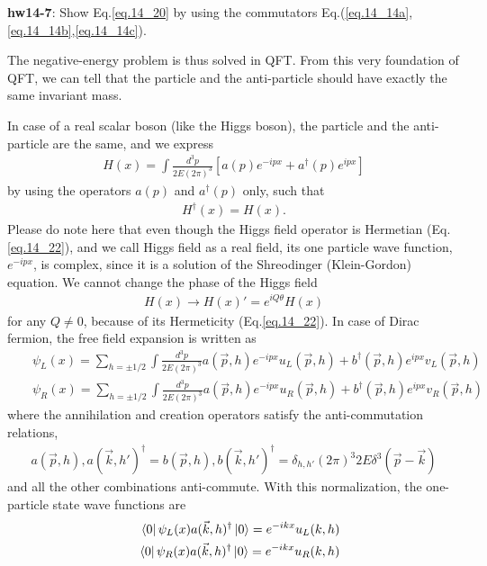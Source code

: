 \documentclass[12pt]{article}
\begin{document}
{\bf hw14-7}: Show Eq.\ref{eq.14_20} by using the commutators Eq.(\ref{eq.14_14a},\ref{eq.14_14b},\ref{eq.14_14c}).

  The negative-energy problem is thus solved in QFT.  From this very
  foundation of QFT, we can tell that the particle and the anti-particle
  should have exactly the same invariant mass.

  In case of a real scalar boson (like the Higgs boson), the particle
  and the anti-particle are the same, and we express
\begin{eqnarray}
  H(x) = \int \frac{d^3p}{2E(2\pi)^3} [a(p) e^{-ipx} + a^\dagger(p) e^{ipx}]\label{eq.14_21}
\end{eqnarray}
  by using the operators $a(p)$ and $a^\dagger(p)$ only, such that
\begin{eqnarray}
  H^\dagger(x) = H(x). \label{eq.14_22}
\end{eqnarray}
  Please do note here that even though the Higgs field operator is
  Hermetian (Eq.\ref{eq.14_22}), and we call Higgs field as a real field, its one particle wave function, $e^{-ipx}$, is complex, since it is a solution
  of the Shreodinger (Klein-Gordon) equation. We cannot change the
  phase of the Higgs field
\begin{eqnarray}
  H(x) \to H(x)' = e^{iQ\theta} H(x) \label{eq.14_23}
\end{eqnarray}
  for any $Q \neq 0$, because of its Hermeticity (Eq.\ref{eq.14_22}).
  In case of Dirac fermion, the free field expansion is written as
\begin{eqnarray}
  &&\psi_L(x)
  = \sum_{h=\pm1/2} \int \frac{d^3p}{2E(2\pi)^3}
  {a({\vec p},h) e^{-ipx} u_L({\vec p},h) +b^\dagger({\vec p},h) e^{ipx} v_L({\vec p},h)} \label{eq.14_24a}\\ 
  &&\psi_R(x)
  = \sum_{h=\pm1/2} \int \frac{d^3p}{2E(2\pi)^3}
  {a({\vec p},h) e^{-ipx} u_R({\vec p},h) +b^\dagger({\vec p},h) e^{ipx} v_R({\vec p},h)}\label{eq.14_24b}
\end{eqnarray}
  where the annihilation and creation operators satisfy the
  anti-commutation relations,
\begin{eqnarray}
  { a({\vec p},h), a({\vec k},h')^\dagger }
    = { b({\vec p},h), b({\vec k},h')^\dagger }
    = \delta_{h,h'} (2\pi)^3 2E \delta^3( {\vec p} - {\vec k} ) \label{eq.14_25}
\end{eqnarray}
  and all the other combinations anti-commute. With this normalization,
  the one-particle state wave functions are
\begin{eqnarray}
  &&\bra{0} \psi_L(x) a({\vec k},h)^\dagger \ket{0}=e^{-ikx} u_L(k,h)\label{eq.14_26a} \\
  &&\bra{0} \psi_R(x) a({\vec k},h)^\dagger \ket{0}=e^{-ikx} u_R(k,h)\label{eq.14_26b}
\end{eqnarray}
\end{document}
